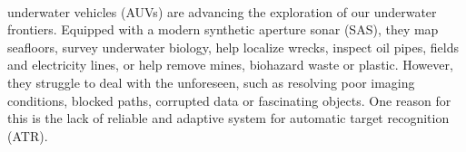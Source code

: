 \begin{figure}[t]
{{}\\[.5\baselineskip]
%
}\label{IV_simulator_coordinate_system}%
\end{figure}





 underwater vehicles (AUVs) are advancing the exploration of our underwater frontiers. Equipped with a modern synthetic aperture sonar (SAS), they map seafloors, survey underwater biology, help localize wrecks, inspect oil pipes, fields and electricity lines, or help remove mines, biohazard waste or plastic. However, they struggle to deal with the unforeseen, such as resolving poor imaging conditions, blocked paths, corrupted data or fascinating objects. One reason for this is the lack of reliable and adaptive system for automatic target recognition (ATR).

 



